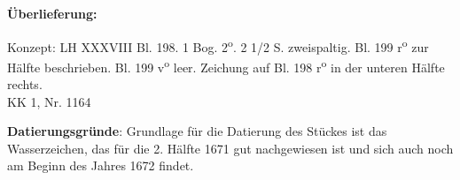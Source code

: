    
        
        \begin{ledgroupsized}[r]{120mm}
        \footnotesize 
        \pstart        
        \noindent\textbf{\"{U}berlieferung:}  
        \pend
        \end{ledgroupsized}
      
       
              \begin{ledgroupsized}[r]{114mm}
              \footnotesize 
              \pstart \parindent -6mm
              Konzept: LH XXXVIII Bl. 198. 1 Bog. 2\textsuperscript{o}. 2 1/2 S. zweispaltig. Bl. 199 r\textsuperscript{o} zur H\"{a}lfte beschrieben. Bl. 199 v\textsuperscript{o} leer. Zeichung auf Bl. 198 r\textsuperscript{o} in der unteren H\"{a}lfte rechts.\\KK 1, Nr. 1164 \pend
              \end{ledgroupsized}
        \vspace*{5mm}
        \begin{ledgroup}
        \footnotesize 
        \pstart
      \noindent\footnotesize{\textbf{Datierungsgr\"{u}nde}: Grundlage f\"{u}r die Datierung des St\"{u}ckes ist das Wasserzeichen, das f\"{u}r die 2. H\"{a}lfte 1671 gut nachgewiesen ist und sich auch noch am Beginn des Jahres 1672 findet.}
        \pend
        \end{ledgroup}
      
